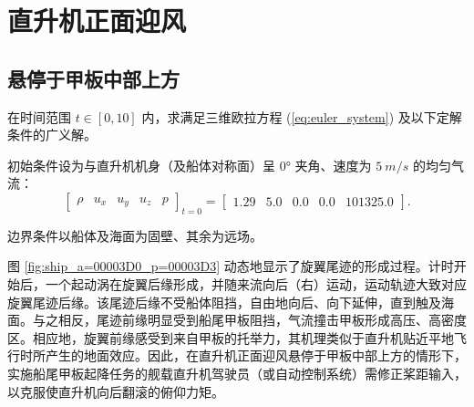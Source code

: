 \section{直升机正面迎风}

\subsection{悬停于甲板中部上方}
\begin{problem}
[直升机正面迎风悬停于甲板中部上方]\label{prob:=0076F4=005347=00673A=006B63=009762=008FCE=0098CE=0060AC=00505C=004E8E=007532=00677F=004E2D=0090E8=004E0A=0065B9}在时间范围
$t\in[0,10]$ 内，求满足三维欧拉方程 (\ref{eq:euler_system}) 及以下定解条件的广义解。

初始条件设为与直升机机身（及船体对称面）呈 $\ang{0}$ 夹角、速度为 $\SI{5}{m/s}$ 的均匀气流：
\begin{equation}
\begin{bmatrix}\rho & u_{x} & u_{y} & u_{z} & p\end{bmatrix}_{t=0}=\begin{bmatrix}1.29 & 5.0 & 0.0 & 0.0 & 101325.0\end{bmatrix}.
\end{equation}

边界条件以船体及海面为固壁、其余为远场。
\end{problem}

图 \ref{fig:ship_a=00003D0_p=00003D3} 动态地显示了旋翼尾迹的形成过程。计时开始后，一个起动涡在旋翼后缘形成，并随来流向后（右）运动，运动轨迹大致对应旋翼尾迹后缘。该尾迹后缘不受船体阻挡，自由地向后、向下延伸，直到触及海面。与之相反，尾迹前缘明显受到船尾甲板阻挡，气流撞击甲板形成高压、高密度区。相应地，旋翼前缘感受到来自甲板的托举力，其机理类似于直升机贴近平地飞行时所产生的地面效应。因此，在直升机正面迎风悬停于甲板中部上方的情形下，实施船尾甲板起降任务的舰载直升机驾驶员（或自动控制系统）需修正桨距输入，以克服使直升机向后翻滚的俯仰力矩。

